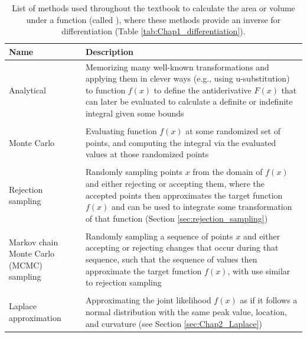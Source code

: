 \begin{table}
  \caption[Methods used for integration]{List of methods used throughout the textbook to calculate the area or volume under a function (called ), where these methods provide an inverse for differentiation (Table \ref{tab:Chap1_differentiation}).}
\begin{center}
\begin{tabularx}{\textwidth}{ | X m{3.5in} | } 
  \hline
  Name & Description \\ 
  \hline

  Analytical & Memorizing many well-known transformations and applying them in clever ways (e.g., using u-substitution) to function \( f(x) \) to define the antiderivative \( F(x) \) that can later be evaluated to calculate a definite or indefinite integral given some bounds \\ & \\ 
  
  Monte Carlo & Evaluating function \( f(x) \) at some randomized set of points, and computing the integral via the evaluated values at those randomized points \\ & \\

  Rejection sampling & Randomly sampling points \(x\) from the domain of \(f(x)\) and either rejecting or accepting them, where the accepted points then approximates the target function \(f(x)\) and can be used to integrate some transformation of that function (Section \ref{sec:rejection_sampling}) \\ & \\

  Markov chain Monte Carlo (MCMC) sampling & Randomly sampling a sequence of points \(x\) and either accepting or rejecting changes that occur during that sequence, such that the sequence of values then approximate the target function \(f(x)\), with use similar to rejection sampling \\ & \\

  Laplace approximation & Approximating the joint likelihood \(f(x)\) as if it follows a normal distribution with the same peak value, location, and curvature (see Section \ref{sec:Chap2_Laplace}) \\
  
  \hline
\end{tabularx}
  \label{tab:Chap2_integration}
\end{center}
\end{table}

